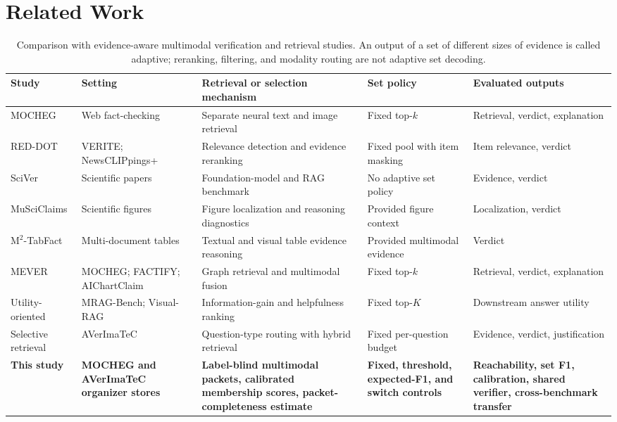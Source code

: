 \section{Related Work}
\label{sec:related}

\begin{table}[t]
\centering
\caption{Comparison with evidence-aware multimodal verification and retrieval studies. An output of a set of different sizes of evidence is called adaptive; reranking, filtering, and modality routing are not adaptive set decoding.}
\label{tab:related-comparison}
\small
\setlength{\tabcolsep}{4pt}
\renewcommand{\arraystretch}{1.13}
\begin{tabular}{@{}>{\raggedright\arraybackslash}p{}
>{\raggedright\arraybackslash}p{}
>{\raggedright\arraybackslash}p{}
>{\raggedright\arraybackslash}p{}
>{\raggedright\arraybackslash}p{}@{}}
\toprule
Study & Setting & Retrieval or selection mechanism & Set policy & Evaluated outputs \\
\midrule
MOCHEG \cite{yao2023mocheg} & Web fact-checking & Separate neural text and image retrieval & Fixed top-$k$ & Retrieval, verdict, explanation \\
RED-DOT \cite{papadopoulos2025reddot} & VERITE; NewsCLIPpings+ & Relevance detection and evidence reranking & Fixed pool with item masking & Item relevance, verdict \\
SciVer \cite{wang2025sciver} & Scientific papers & Foundation-model and RAG benchmark & No adaptive set policy & Evidence, verdict \\
MuSciClaims \cite{lal2025musciclaims} & Scientific figures & Figure localization and reasoning diagnostics & Provided figure context & Localization, verdict \\
M$^2$-TabFact \cite{zhou2025m2tabfact} & Multi-document tables & Textual and visual table evidence reasoning & Provided multimodal evidence & Verdict \\
MEVER \cite{zhang2026mever} & MOCHEG; FACTIFY; AIChartClaim & Graph retrieval and multimodal fusion & Fixed top-$k$ & Retrieval, verdict, explanation \\
Utility-oriented \cite{luo2026utility} & MRAG-Bench; Visual-RAG & Information-gain and helpfulness ranking & Fixed top-$K$ & Downstream answer utility \\
Selective retrieval \cite{tsoneva2026selective} & AVerImaTeC & Question-type routing with hybrid retrieval & Fixed per-question budget & Evidence, verdict, justification \\
\midrule
\textbf{This study} & \textbf{MOCHEG and AVerImaTeC organizer stores} & \textbf{Label-blind multimodal packets, calibrated membership scores, packet-completeness estimate} & \textbf{Fixed, threshold, expected-F1, and switch controls} & \textbf{Reachability, set F1, calibration, shared verifier, cross-benchmark transfer} \\
\bottomrule
\end{tabular}
\end{table}

